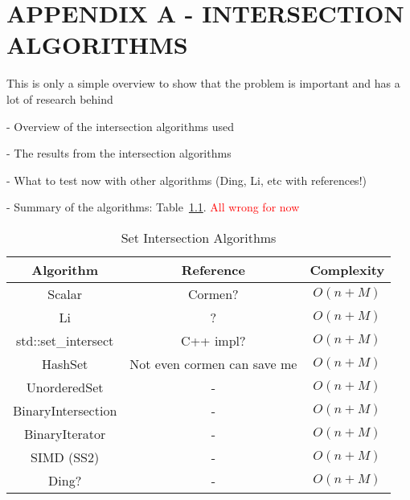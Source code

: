 
\hypertarget{appendix:a}{} %
\renewcommand{\thechapter}{}%
\chapter{APPENDIX A - INTERSECTION ALGORITHMS}
\label{ap:a}
\renewcommand{\thechapter}{A}

This is only a simple overview to show that the problem is important and has a lot of research behind

- Overview of the intersection algorithms used

- The results from the intersection algorithms

- What to test now with other algorithms (Ding, Li, etc with references!)

- Summary of the algorithms: Table~\ref{tab:setintersectalgos}.
\textcolor{red}{All wrong for now}

\begin{table}[!ht]
  \begin{center}
    \caption{Set Intersection Algorithms}\label{tab:setintersectalgos}
    \begin{tabular*}{\textwidth}{|c|c|c|}
      \hline
      \textbf{Algorithm} &\bfseries Reference & \bfseries Complexity \\
      \hline
      Scalar & Cormen? & $O(n + M)$ \\
      \hline
      Li & ? & $O(n + M)$ \\
      \hline
      std::set\_intersect & C++ impl? & $O(n + M)$ \\
      \hline
      HashSet & Not even cormen can save me & $O(n + M)$ \\
      \hline
      UnorderedSet & - & $O(n + M)$ \\
      \hline
      BinaryIntersection & - & $O(n + M)$ \\
      \hline
      BinaryIterator & - & $O(n + M)$ \\
      \hline
      SIMD (SS2) & - & $O(n + M)$ \\
      \hline
      Ding? & - &  $O(n + M)$ \\
      \hline
    \end{tabular*}
  \end{center}
\end{table}

